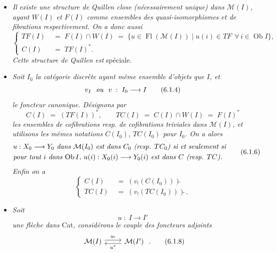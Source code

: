 \documentclass[11pt]{article}
\newcommand{\printedpage}[1]{\marginpar{\footnotesize p.~#1}}
\newcommand{\msp}[1]{\marginpar{\footnotesize [#1]}}
\newcommand{\Fl}{\operatorname{Fl}}
\newcommand{\Ob}{\operatorname{Ob}}
\newcommand{\tl}{\tilde{}}
\begin{document}
\begin{itemize}[leftmargin=2.5em]
\item[a)] \textit{Il existe une structure de Quillen close (nécessairement unique) dans $\mathcal{M}(I)$, ayant $W(I)$ et $F(I)$ comme ensembles des quasi-isomorphismes et de fibrations respectivement. On a donc aussi}
\[
\left\{
\begin{aligned}
TF(I) \;&=\; F(I)\cap W(I) \;=\; \{u\in \Fl(\mathcal{M}(I)) \mid u(i)\in TF \ \ \forall\, i\in \Ob I\},\\
C(I) \;&=\; TF(I)^{*}.
\end{aligned}
\right.
\tag*{(6.1.3)}
\]
\textit{Cette structure de Quillen est} spéciale.

\msp{page 99}
\item[b)] \textit{Soit $I_0$ la catégorie discrète ayant même ensemble d'objets que $I$, et}
\[
v_I \ \ \text{\textit{ou}}\ \ v \;:\; I_0 \longrightarrow I
\tag*{(6.1.4)}
\]
\textit{le foncteur canonique. Désignons par}
\[
C(I) \;=\; (TF(I))^{*}, \qquad TC(I) \;=\; C(I)\cap W(I) \;=\; F(I)^{*}
\tag*{(6.1.5)}
\]
\textit{les ensembles de cofibrations resp. de cofibrations triviales dans $\mathcal{M}(I)$, et utilisons les mêmes notations $C(I_0)$, $TC(I_0)$ pour $I_0$. On a alors}
\[
\begin{aligned}
&\text{\textit{$u : X_0 \longrightarrow Y_0$ dans $\mathcal{M}(I_0)$ est dans $C_0$ (resp. $TC_0$) si et seulement si}}\\
&\text{\textit{pour tout $i$ dans $\Ob I$, $u(i) : X_0(i) \longrightarrow Y_0(i)$ est dans $C$ (resp. $TC$).}}
\end{aligned}
\tag*{(6.1.6)}
\]
\textit{Enfin on a}
\[
\left\{
\begin{aligned}
C(I) \;&=\; (v_!(C(I_0)))\tl\\
TC(I) \;&=\; (v_!(TC(I_0)))\tl\,.
\end{aligned}
\right.
\tag*{(6.1.7)} %
\]

\item[c)] \textit{Soit}
\[
u \;:\; I \longrightarrow I'
\]
\textit{une flèche dans} Cat\textit{, considérons le couple des foncteurs adjoints}
\[
\begin{tikzcd}
\mathcal{M}(I) \arrow[r, shift left, "u_!"] & \mathcal{M}(I') \arrow[l, shift left, "u^{*}"]
\end{tikzcd}
\;.
\tag*{(6.1.8)}
\]

\printedpage{50}


\end{itemize}
\end{document}
